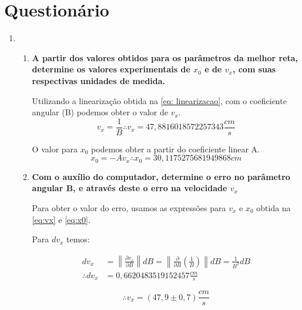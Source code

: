 \chapter{Questionário}\label{cap:questionario}

\begin{enumerate}
    \item 
    \begin{enumerate}
        \item \textbf{A partir dos valores obtidos para os parâmetros da melhor reta, determine os valores experimentais de $x_0$ e de $v_x$, com suas respectivas unidades de medida.} 
        
        Utilizando a linearização obtida na \autoref{eq: linearizacao}, com o coeficiente angular (B) podemos obter o valor de $v_x$.
        \begin{equation}\label{eq:vx}
            v_x = \frac{1}{B} \therefore v_x = 47,8816018572257343 \frac{cm}{s}
        \end{equation}

        O valor para $x_0$ podemos obter a partir do coeficiente linear A.
        \begin{equation}\label{eq:x0}
            x_0 = -A v_x \therefore x_0 = 30,1175275681949868 cm
        \end{equation}

        \item \textbf{ Com o auxílio do computador, determine o erro no parâmetro angular B, e através deste o erro na velocidade $v_x$}

        Para obter o valor do erro, usamos as expressões para $v_x$ e $x_0$ obtida na \autoref{eq:vx} e \autoref{eq:x0}.

        Para $dv_x$ temos:

        \begin{align}
            dv_x &= \left\| \frac{\partial v_x}{\partial B}\right\| dB = \left\|\frac{\partial}{\partial B} \left(\frac{1}{B}\right)\right\| dB = \frac{1}{B^2} dB \\
            \therefore dv_x &= 0,6620483519152457 \frac{cm}{s}
        \end{align}

        \begin{equation}
            \therefore v_x = \left(47,9 \pm 0,7 \right) \frac{cm}{s}
        \end{equation}


\end{enumerate}
\end{enumerate}
